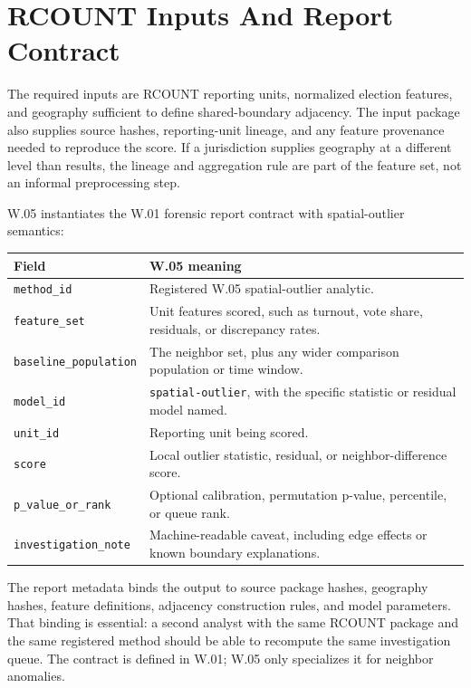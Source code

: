 \section{RCOUNT Inputs And Report Contract}

The required inputs are RCOUNT reporting units, normalized election features,
and geography sufficient to define shared-boundary adjacency. The input package
also supplies source hashes, reporting-unit lineage, and any feature provenance
needed to reproduce the score. If a jurisdiction supplies geography at a
different level than results, the lineage and aggregation rule are part of the
feature set, not an informal preprocessing step.

W.05 instantiates the W.01 forensic report contract with spatial-outlier
semantics:

\begin{center}
\small
\begin{tabularx}{\textwidth}{lX}
\toprule
Field & W.05 meaning \\
\midrule
\texttt{method\_id} & Registered W.05 spatial-outlier analytic. \\
\texttt{feature\_set} & Unit features scored, such as turnout, vote share, residuals, or discrepancy rates. \\
\texttt{baseline\_population} & The neighbor set, plus any wider comparison population or time window. \\
\texttt{model\_id} & \texttt{spatial-outlier}, with the specific statistic or residual model named. \\
\texttt{unit\_id} & Reporting unit being scored. \\
\texttt{score} & Local outlier statistic, residual, or neighbor-difference score. \\
\texttt{p\_value\_or\_rank} & Optional calibration, permutation p-value, percentile, or queue rank. \\
\texttt{investigation\_note} & Machine-readable caveat, including edge effects or known boundary explanations. \\
\bottomrule
\end{tabularx}
\end{center}

The report metadata binds the output to source package hashes, geography hashes,
feature definitions, adjacency construction rules, and model parameters. That
binding is essential: a second analyst with the same RCOUNT package and the same
registered method should be able to recompute the same investigation queue. The
contract is defined in W.01; W.05 only specializes it for neighbor anomalies.
